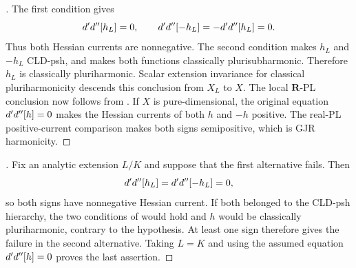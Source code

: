 
\begin{proof}[]
The first condition gives
\[
 d'd''[h_L]=0,
 \qquad
 d'd''[-h_L]=-d'd''[h_L]=0.
\]
Thus both Hessian currents are nonnegative.  The second condition makes
$h_L$ and $-h_L$ CLD-psh, and
 makes both functions classically
plurisubharmonic.  Therefore $h_L$ is classically pluriharmonic.  Scalar
extension invariance for classical pluriharmonicity
\cite[Proposition~7.2(6)]{GR25Classical} descends this conclusion from
$X_L$ to $X$.  The local $\mathbf R$-PL conclusion now follows from
.  If $X$ is
pure-dimensional, the original equation $d'd''[h]=0$ makes the
Hessian currents of both $h$ and $-h$ positive.  The real-PL
positive-current comparison
 makes both signs
semipositive, which is GJR harmonicity.
\end{proof}

\begin{proof}[]
Fix an analytic extension $L/K$ and suppose that the first alternative
fails.  Then
\[
 d'd''[h_L]=d'd''[-h_L]=0,
\]
so both signs have nonnegative Hessian current.  If both belonged to the
CLD-psh hierarchy, the two conditions of
 would hold and $h$ would
be classically pluriharmonic, contrary to the hypothesis.  At least one
sign therefore gives the failure in the second alternative.  Taking
$L=K$ and using the assumed equation $d'd''[h]=0$ proves the
last assertion.
\end{proof}
